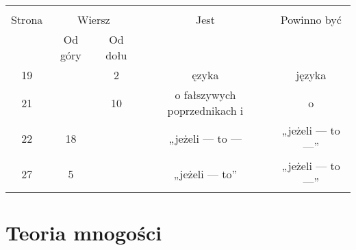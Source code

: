 \documentclass[a4paper,11pt]{article}
\begin{document}
\vspace{\spaceTwo}













\begin{center}

  \begin{tabular}{|c|c|c|c|c|}
    \hline
    & \multicolumn{2}{c|}{} & & \\
    Strona & \multicolumn{2}{c|}{Wiersz} & Jest
                              & Powinno być \\ \cline{2-3}
    & Od góry & Od dołu & & \\
    \hline
    19  & &  2 & ęzyka & języka \\
    21  & & 10 & o fałszywych poprzednikach i & o \\
    22  & 18 & & „jeżeli --- to --- & „jeżeli --- to ---” \\
    27  &  5 & & „jeżeli --- to” & „jeżeli --- to ---” \\
    \hline
  \end{tabular}

\end{center}

\vspace{\spaceTwo}










\newpage
\section{Teoria mnogości}

\vspace{\spaceTwo}



\end{document}
